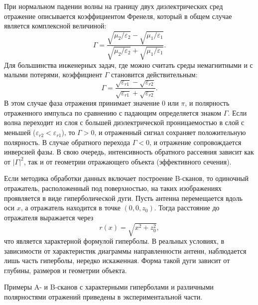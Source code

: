 При нормальном падении волны на границу двух диэлектрических сред отражение описывается коэффициентом Френеля, который в общем случае является комплексной величиной:
\begin{equation}
    \Gamma = \frac{\sqrt{\mu_2/\varepsilon_2} - \sqrt{\mu_1/\varepsilon_1}}
    {\sqrt{\mu_2/\varepsilon_2} + \sqrt{\mu_1/\varepsilon_1}}.
\end{equation}
Для большинства инженерных задач, где можно считать среды немагнитными и с малыми потерями, коэффициент $\Gamma$ становится действительным:
\begin{equation}
    \Gamma = \frac{\sqrt{\varepsilon_{r1}} - \sqrt{\varepsilon_{r2}}}
    {\sqrt{\varepsilon_{r1}} + \sqrt{\varepsilon_{r2}}}.
\end{equation}
В этом случае фаза отражения принимает значение 0 или $\pi$, и полярность отраженного импульса по сравнению с падающим определяется знаком $\Gamma$. Если волна переходит из слоя с большей диэлектрической проницаемостью в слой с меньшей ($\varepsilon_{r2} < \varepsilon_{r1}$), то $\Gamma > 0$, и отраженный сигнал сохраняет положительную полярность. В случае обратного перехода $\Gamma < 0$, и отражение сопровождается инверсией фазы. В свою очередь, интенсивность обратного рассеяния зависит как от $|\Gamma|^2$, так и от геометрии отражающего объекта (эффективного сечения).

Если методика обработки данных включает построение B-сканов, то одиночный отражатель, расположенный под поверхностью, на таких изображениях проявляется в виде гиперболической дуги. Пусть антенна перемещается вдоль оси $x$, а отражатель находится в точке $(0, 0, z_0)$. Тогда расстояние до отражателя выражается через
\begin{equation}
    r(x) = \sqrt{x^2 + z_0^2},
\end{equation}
что является характерной формулой гиперболы. В реальных условиях, в зависимости от характеристик диаграммы направленности антенн, наблюдается лишь часть гиперболы, нередко искаженная. Форма такой дуги зависит от глубины, размеров и геометрии объекта.

Примеры A- и B-сканов с характерными гиперболами и различными полярностями отражений приведены в экспериментальной части.

